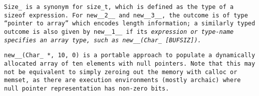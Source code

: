 \note \tt{Size_} is a synonym for \tt{size_t},
which is defined as the type of a \tt{sizeof} expression.
For \tt{new__2__} and \tt{new__3__},
the outcome is of type ``pointer to array'' which encodes length information;
a similarly typed outcome is also given by \tt{new__1__} if its \it{expression}
or \it{type-name} specifies an array type, such as \tt{new__(Char_ [BUFSIZ])}.

\example \tt{new__(Char_ *, 10, 0)} is a portable approach to populate
a dynamically allocated array of ten elements with null pointers.
Note that this may not be equivalent to simply zeroing out the memory
with \tt{calloc} or \tt{memset}, as there are execution environments
(mostly archaic) where null pointer representation has non-zero bits.
